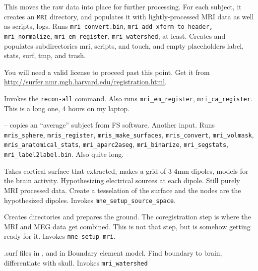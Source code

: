 \documentclass[11pt]{article}
\begin{document}
\begin{itemize}
This moves the raw data into place for further processing.  For each subject,
it creates an \verb+MRI+ directory, and populates it with lightly-processed
MRI data as well as scripts, logs.  Runs \verb+mri_convert.bin+,
\verb+mri_add_xform_to_header, +\verb+mri_normalize+,
\verb+mri_em_register+, \verb+mri_watershed+, at least.  Creates and populates
subdirectories mri, scripts, and touch, and empty placeholders label, stats,
surf, tmp, and trash.

You will need a valid \fs license
to proceed past this point.  Get it from
\url{http://surfer.nmr.mgh.harvard.edu/registration.html}.

 Invokes the \fs
\verb+recon-all+ command.  Also runs \verb+mri_em_register+,
\verb+mri_ca_register+.  This is a long one, 4 hours on my laptop.

 -- copies an ``average'' subject from FS software.
Another input.  Runs
  \verb+mris_sphere+, \verb+mris_register+, \verb+mris_make_surfaces+,
  \verb+mris_convert+, \verb+mri_volmask+,
  \verb+mris_anatomical_stats+, \verb+mri_aparc2aseg+,
  \verb+mri_binarize+, \verb+mri_segstats+,
  \verb+mri_label2label.bin+.  Also quite long.

 Takes cortical
surface that \fs
  extracted, makes a grid of 3-4mm dipoles, models for the brain
  activity. Hypothesizing electrical sources at each dipole.  Still
  purely MRI processed data.  Create a tesselation of the surface and
  the nodes are the hypothesized dipoles.  Invokes
  \verb+mne_setup_source_space+.

 Creates
directories and prepares the ground.  The
  coregistration step is where the MRI and MEG data get combined. This
  is not that step, but is somehow getting ready for it.  Invokes
  \verb+mne_setup_mri+.

%
{.surf files in , and in
  } Boundary element model.  Find
boundary to brain, differentiate with skull.  Invokes \verb+mri_watershed+


\end{itemize}
\end{document}
